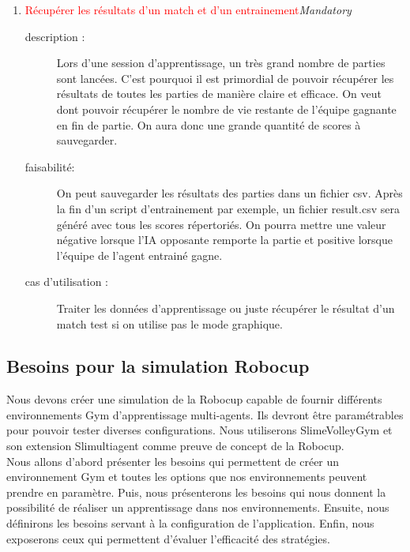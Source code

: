 \documentclass[11pt, a4paper]{article}
\newcommand{\besoinVItem}[4]{
	\item #1
	\begin{description}
		\item[description :]
		#2
		\item[faisabilité: ]
		#3
		\item[cas d'utilisation :]
		#4
	\end{description}
}
\begin{document}
\begin{enumerate}
		\besoinVItem{\textcolor{red}{Récupérer les résultats d'un match et d'un entrainement}\textit{Mandatory}}
		{
			Lors d'une session d'apprentissage, un très grand nombre de parties sont lancées. C'est pourquoi il est primordial de pouvoir récupérer les résultats de toutes les parties de manière claire et efficace. On veut dont pouvoir récupérer le nombre de vie restante de l'équipe gagnante en fin de partie. On aura donc une grande quantité de scores à sauvegarder. \label{résultats}
		}
		{
			On peut sauvegarder les résultats des parties dans un fichier csv. Après la fin d'un script d'entrainement par exemple, un fichier result.csv sera généré avec tous les scores répertoriés. On pourra mettre une valeur négative lorsque l'IA opposante remporte la partie et positive lorsque l'équipe de l'agent entrainé gagne.
		}
		{
			Traiter les données d'apprentissage ou juste récupérer le résultat d'un match test si on utilise pas le mode graphique.
		}



	\end{enumerate}



	\subsection{Besoins pour la  simulation Robocup }

	Nous devons créer une simulation de la Robocup capable de fournir différents environnements Gym d'apprentissage multi-agents. Ils devront être paramétrables pour pouvoir tester diverses configurations. Nous utiliserons SlimeVolleyGym et son extension Slimultiagent comme preuve de concept de la Robocup. \\

	Nous allons d'abord présenter les besoins qui permettent de créer un environnement Gym et toutes les options que nos environnements peuvent prendre en paramètre. Puis, nous présenterons les besoins qui nous donnent la possibilité de réaliser un apprentissage dans nos environnements. Ensuite, nous définirons les besoins servant à la configuration de l'application. Enfin, nous exposerons ceux qui permettent d'évaluer l'efficacité des stratégies.
\end{document}
